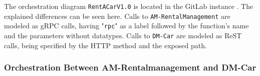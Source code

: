 The orchestration diagram \texttt{RentACarV1.0} is located in the GitLab instance \cite{CM-G-ORC}.
The explained differences can be seen here.
Calls to \texttt{AM-RentalManagement} are modeled as gRPC calls, having "\texttt{rpc}" as a label followed by the function's name and the parameters without datatypes.
Calls to \texttt{DM-Car} are modeled as ReST calls, being specified by the HTTP method and the exposed path.

\subsubsection*{Orchestration Between AM-Rentalmanagement and DM-Car}




